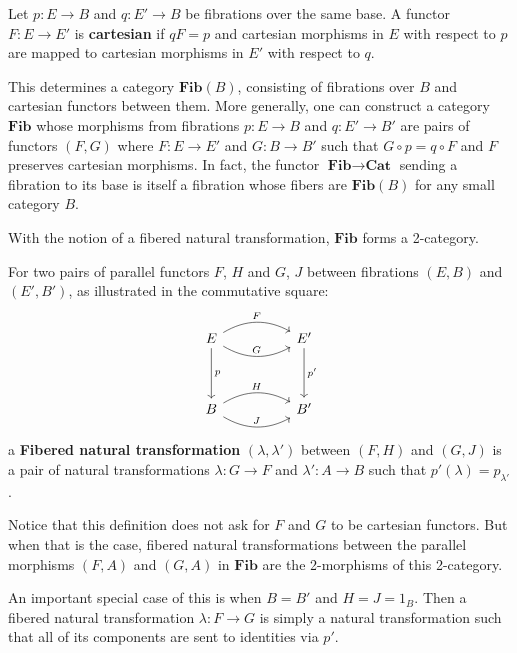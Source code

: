 \begin{defn}
Let $p : E \to B$ and $q : E' \to B$ be fibrations over the same base. A functor $F : E \to E'$ is \textbf{cartesian} if $qF = p$ and cartesian morphisms in $E$ with respect to $p$ are mapped to cartesian morphisms in $E'$ with respect to $q$.
\end{defn}
This determines a category $\textbf{Fib}(B)$, consisting of fibrations over $B$ and cartesian functors between them. More generally, one can construct a category $\textbf{Fib}$ whose morphisms from fibrations $p : E \to B$ and $q : E' \to B'$ are pairs of functors $(F, G)$ where $F : E \to E'$ and $G : B \to B'$ such that $G \circ p = q \circ F$ and $F$ preserves cartesian morphisms. In fact, the functor $\textbf{Fib} \to \textbf{Cat}$ sending a fibration to its base is itself a fibration whose fibers are $\textbf{Fib}(B)$ for any small category $B$.


With the notion of a fibered natural transformation, $\mathbf{Fib}$ forms a 2-category.
\begin{defn}
For two pairs of parallel functors $F$, $H$ and $G$, $J$ between fibrations $(E, B)$ and $(E', B')$, as illustrated in the commutative square:
\[
\ti
E \ar[d, "p"] \ar[r, "F", bend left] \ar[r, "G", bend right] & E' \ar[d, "{p'}"]\\
B \ar[r, "H", bend left] \ar[r, "J", bend right] & B'
\kz
\]
a \textbf{Fibered natural transformation} $(\lambda, \lambda')$ between $(F, H)$ and $(G, J)$ is a pair of natural transformations $\lambda : G \to F$ and $\lambda' : A \to B$ such that $p'(\lambda) = p_{\lambda'}$.
\end{defn}
\begin{rem} Notice that this definition does not ask for $F$ and $G$ to be cartesian functors. But when that is the case, fibered natural transformations between the parallel morphisms $(F, A)$ and $(G, A)$ in $\mathbf{Fib}$ are the 2-morphisms of this 2-category.
\end{rem}
An important special case of this is when $B = B'$ and $H = J = 1_B$. Then a fibered natural transformation $\lambda : F \to G$ is simply a natural transformation such that all of its components are sent to identities via $p'$.


